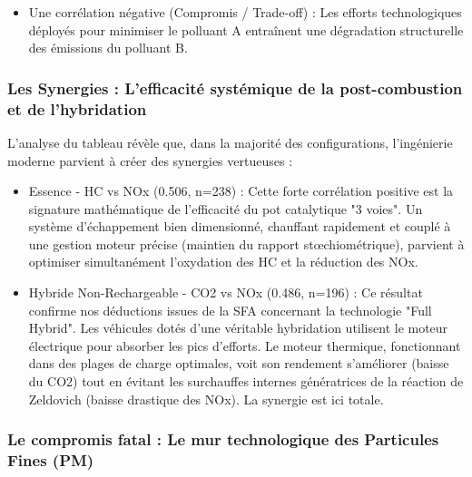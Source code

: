 \vspace{0.6em}

\begin{itemize}
    \item Une corrélation négative (Compromis / Trade-off) : Les efforts technologiques déployés pour minimiser le polluant A entraînent une dégradation structurelle des émissions du polluant B.
\end{itemize}

\subsubsection{Les Synergies : L'efficacité systémique de la post-combustion et de l'hybridation}

L'analyse du tableau révèle que, dans la majorité des configurations, l'ingénierie moderne parvient à créer des synergies vertueuses :

\vspace{0.5em}

\begin{itemize}
    \item Essence - HC vs NOx (0.506, n=238) : Cette forte corrélation positive est la signature mathématique de l'efficacité du pot catalytique "3 voies". Un système d'échappement bien dimensionné, chauffant rapidement et couplé à une gestion moteur précise (maintien du rapport stœchiométrique), parvient à optimiser simultanément l'oxydation des HC et la réduction des NOx.
\end{itemize}

\vspace{0.6em}

\begin{itemize}
    \item Hybride Non-Rechargeable - CO2 vs NOx (0.486, n=196) : Ce résultat confirme nos déductions issues de la SFA concernant la technologie "Full Hybrid". Les véhicules dotés d'une véritable hybridation utilisent le moteur électrique pour absorber les pics d'efforts. Le moteur thermique, fonctionnant dans des plages de charge optimales, voit son rendement s'améliorer (baisse du CO2) tout en évitant les surchauffes internes génératrices de la réaction de Zeldovich (baisse drastique des NOx). La synergie est ici totale.
\end{itemize}

\subsubsection{Le compromis fatal : Le mur technologique des Particules Fines (PM)}

